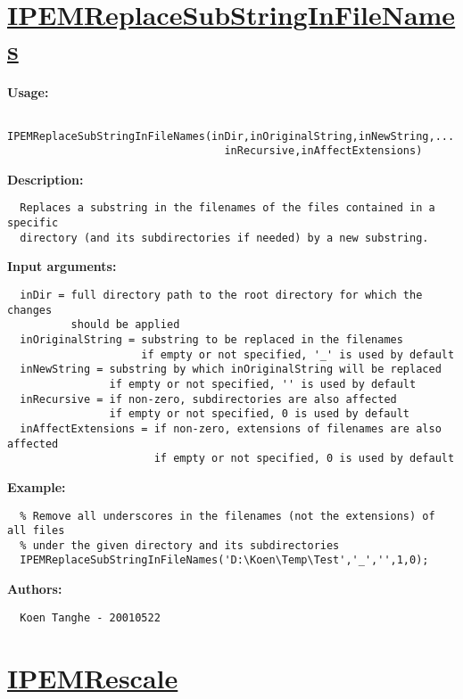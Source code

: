 \newpage
\section*{\hyperlink{Concepts:IPEMReplaceSubStringInFileNames}{IPEMReplaceSubStringInFileNames}}
\hypertarget{FuncRef:IPEMReplaceSubStringInFileNames}{}

\textbf{Usage:}
\begin{verbatim}  IPEMReplaceSubStringInFileNames(inDir,inOriginalString,inNewString,...
                                  inRecursive,inAffectExtensions)

\end{verbatim}
\textbf{Description:}
\begin{verbatim}  Replaces a substring in the filenames of the files contained in a specific
  directory (and its subdirectories if needed) by a new substring.

\end{verbatim}
\textbf{Input arguments:}
\begin{verbatim}  inDir = full directory path to the root directory for which the changes
          should be applied
  inOriginalString = substring to be replaced in the filenames
                     if empty or not specified, '_' is used by default
  inNewString = substring by which inOriginalString will be replaced
                if empty or not specified, '' is used by default
  inRecursive = if non-zero, subdirectories are also affected
                if empty or not specified, 0 is used by default
  inAffectExtensions = if non-zero, extensions of filenames are also affected
                       if empty or not specified, 0 is used by default

\end{verbatim}
\textbf{Example:}
\begin{verbatim}  % Remove all underscores in the filenames (not the extensions) of all files
  % under the given directory and its subdirectories
  IPEMReplaceSubStringInFileNames('D:\Koen\Temp\Test','_','',1,0);

\end{verbatim}
\textbf{Authors:}
\begin{verbatim}  Koen Tanghe - 20010522
\end{verbatim}


\newpage
\section*{\hyperlink{Concepts:IPEMRescale}{IPEMRescale}}
\hypertarget{FuncRef:IPEMRescale}{}

